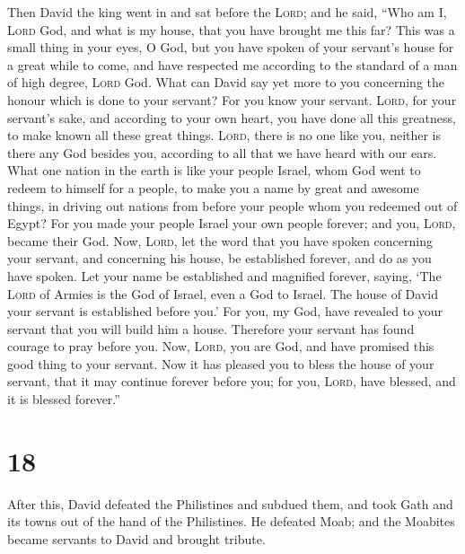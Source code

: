  Then David the king went in and sat before the
\textsc{Lord}; and he said, ``Who am I, \textsc{Lord} God, and what is
my house, that you have brought me this far?  This was a
small thing in your eyes, O God, but you have spoken of your servant's
house for a great while to come, and have respected me according to the
standard of a man of high degree, \textsc{Lord} God. 
What can David say yet more to you concerning the honour which is done
to your servant? For you know your servant. 
\textsc{Lord}, for your servant's sake, and according to your own heart,
you have done all this greatness, to make known all these great things.
 \textsc{Lord}, there is no one like you, neither is
there any God besides you, according to all that we have heard with our
ears.  What one nation in the earth is like your people
Israel, whom God went to redeem to himself for a people, to make you a
name by great and awesome things, in driving out nations from before
your people whom you redeemed out of Egypt?  For you made
your people Israel your own people forever; and you, \textsc{Lord},
became their God.  Now, \textsc{Lord}, let the word that
you have spoken concerning your servant, and concerning his house, be
established forever, and do as you have spoken.  Let your
name be established and magnified forever, saying, `The \textsc{Lord} of
Armies is the God of Israel, even a God to Israel. The house of David
your servant is established before you.'  For you, my
God, have revealed to your servant that you will build him a house.
Therefore your servant has found courage to pray before you.
 Now, \textsc{Lord}, you are God, and have promised this
good thing to your servant.  Now it has pleased you to
bless the house of your servant, that it may continue forever before
you; for you, \textsc{Lord}, have blessed, and it is blessed forever.''

\hypertarget{section-17}{%
\section{18}\label{section-17}}

 After this, David defeated the Philistines and subdued
them, and took Gath and its towns out of the hand of the Philistines.
 He defeated Moab; and the Moabites became servants to
David and brought tribute.


